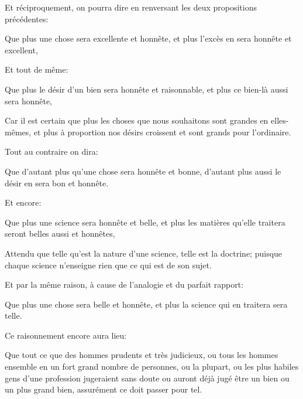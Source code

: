 Et réciproquement, on pourra dire en renversant les deux propositions précédentes:

\begin{lieu}
	Que plus une chose sera excellente et honnête, et plus l'excès en sera honnête et excellent,
\end{lieu}

Et tout de même:

\begin{lieu}
	Que plus le désir d'un bien sera honnête et raisonnable, et plus ce bien-là aussi sera honnête,
\end{lieu}

Car il est certain que plus les choses que nous souhaitons sont grandes en elles-mêmes, et plus à proportion nos désirs
croissent et sont grands pour l'ordinaire.

\bigbreak

Tout au contraire on dira:

\begin{lieu}
	Que d'autant plus qu'une chose sera honnête et bonne, d'autant plus aussi le désir en sera bon et honnête.
\end{lieu}

Et encore:

\begin{lieu}
	Que plus une science sera honnête et belle, et plus les matières qu'elle traitera seront belles aussi et honnêtes,
\end{lieu}

Attendu que telle qu'est la nature d'une science, telle est la doctrine; puisque chaque science n'enseigne rien que ce qui
est de son sujet.

Et par la même raison, à cause de l'analogie et du parfait rapport:

\begin{lieu}
	Que plus une chose sera belle et honnête, et plus la science qui en traitera sera telle.
\end{lieu}

\bigbreak

Ce raisonnement encore aura lieu:

\begin{lieu}
	Que tout ce que des hommes prudents et très judicieux, ou tous les hommes ensemble en un fort grand nombre de personnes,
	ou la plupart, ou les plus habiles gens d'une profession jugeraient sans doute ou auront déjà jugé être un bien ou un plus
	grand bien, assurément ce doit passer pour tel.
\end{lieu}

